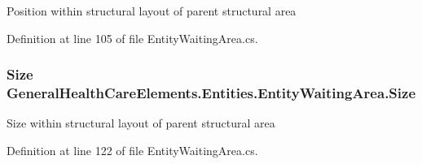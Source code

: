 Position within structural layout of parent structural area 



Definition at line 105 of file Entity\+Waiting\+Area.\+cs.

\subsubsection[{\texorpdfstring{Size}{Size}}]{\setlength{\rightskip}{0pt plus 5cm}Size General\+Health\+Care\+Elements.\+Entities.\+Entity\+Waiting\+Area.\+Size\hspace{0.3cm}{\ttfamily [get]}}\hypertarget{class_general_health_care_elements_1_1_entities_1_1_entity_waiting_area_ac188423086574de63ddf76b800237976}{}\label{class_general_health_care_elements_1_1_entities_1_1_entity_waiting_area_ac188423086574de63ddf76b800237976}


Size within structural layout of parent structural area 



Definition at line 122 of file Entity\+Waiting\+Area.\+cs.

